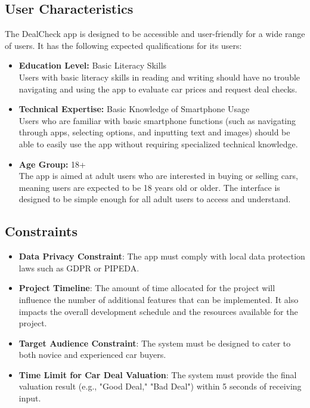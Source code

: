 \documentclass[]{article}
\begin{document}
\subsection{User Characteristics}
\label{sub:user_characteristics}
	The DealCheck app is designed to be accessible and user-friendly for a wide range of users. It has the following expected qualifications for its users:
\begin{itemize}
    \item \textbf{Education Level:} Basic Literacy Skills\\
    Users with basic literacy skills in reading and writing should have no trouble navigating and using the app to evaluate car prices and request deal checks.
    
    \item \textbf{Technical Expertise:} Basic Knowledge of Smartphone Usage\\
    Users who are familiar with basic smartphone functions (such as navigating through apps, selecting options, and inputting text and images) should be able to easily use the app without requiring specialized technical knowledge.
    
    \item \textbf{Age Group:} 18+\\
    The app is aimed at adult users who are interested in buying or selling cars, meaning users are expected to be 18 years old or older. The interface is designed to be simple enough for all adult users to access and understand.
\end{itemize}

\subsection{Constraints}
\label{sub:constraints}
\begin{itemize}
    \item \textbf{Data Privacy Constraint}: The app must comply with local data protection laws such as GDPR or PIPEDA.
    \item \textbf{Project Timeline}: The amount of time allocated for the project will influence the number of additional features that can be implemented. It also impacts the overall development schedule and the resources available for the project.
    \item \textbf{Target Audience Constraint}: The system must be designed to cater to both novice and experienced car buyers.
    \item \textbf{Time Limit for Car Deal Valuation}: The system must provide the final valuation result (e.g., "Good Deal," "Bad Deal") within 5 seconds of receiving input.
\end{itemize}
\end{document}
